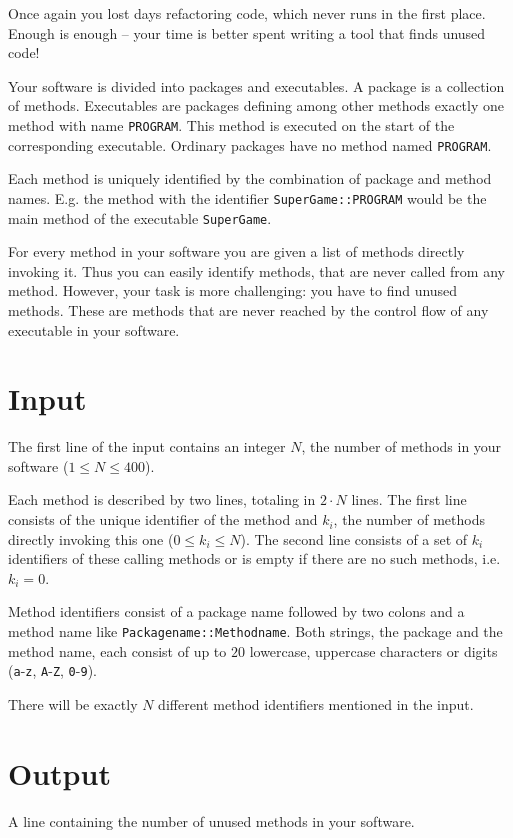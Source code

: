 
Once again you lost days refactoring code, which never runs in the first place. Enough is enough -- your time is better spent writing a tool that finds unused code!

Your software is divided into packages and executables. A package is a collection of methods. Executables are packages defining among other methods exactly one method with name {\tt PROGRAM}. This method is executed on the start of the corresponding executable. Ordinary packages have no method named {\tt PROGRAM}.

Each method is uniquely identified by the combination of package and method names. E.g. the method with the identifier {\tt SuperGame::PROGRAM} would be the main method of the executable {\tt SuperGame}. 

For every method in your software you are given a list of methods directly invoking it. Thus you can easily identify methods, that are never called from any method. However, your task is more challenging: you have to find unused methods. These are methods that are never reached by the control flow  of any executable in your software.

\section*{Input}
The first line of the input contains an integer $N$, the number of methods in your software ($1\leq N\leq 400$). 

Each method is described by two lines, totaling in $2\cdot N$ lines. The first line consists of the unique identifier of the method and $k_i$, the number of methods directly invoking this one ($0 \leq k_i \leq N$). The second line consists of a set of $k_i$ identifiers of these calling methods or is empty if there are no such methods, i.e.~$k_i = 0$.

Method identifiers consist of a package name followed by two colons and a method name like {\tt Packagename::Methodname}. Both strings, the package and the method name, each consist of up to $20$ lowercase, uppercase characters or digits ({\tt a}-{\tt z}, {\tt A}-{\tt Z}, {\tt 0}-{\tt 9}).

There will be exactly $N$ different method identifiers mentioned in the input.

\section*{Output}
A line containing the number of unused methods in your software.
